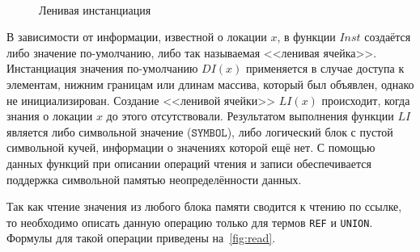 \begin{figure}[H]
\centering
\tiny
\setlength{\jot}{1pt}
\begin{mymathbox}
     \\
\end{mymathbox}
\normalsize
\caption{Ленивая инстанциация} \label{fig:inst}
\end{figure}

В зависимости от информации, известной о локации $x$, в функции $Inst$ создаётся либо значение по-умолчанию, либо так называемая <<ленивая ячейка>>. Инстанциация значения по-умолчанию $DI(x)$ применяется в случае доступа к элементам, нижним границам или длинам массива, который был объявлен, однако не инициализирован. Создание <<ленивой ячейки>> $LI(x)$ происходит, когда знания о локации $x$ до этого отсутствовали. Результатом выполнения функции $LI$ является либо символьной значение ($\texttt{SYMBOL}$), либо логический блок с пустой символьной кучей, информации о значениях которой ещё нет. С помощью данных функций при описании операций чтения и записи обеспечивается поддержка символьной памятью неопределённости данных.

Так как чтение значения из любого блока памяти сводится к чтению по ссылке, то необходимо описать данную операцию только для термов \texttt{REF} и \texttt{UNION}. Формулы для такой операции приведены на~\autoref{fig:read}.

